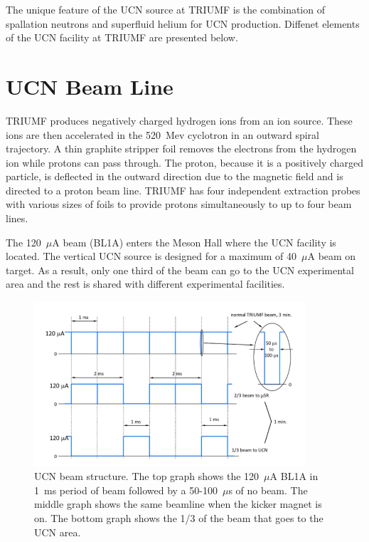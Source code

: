The unique feature of the UCN source at TRIUMF is the combination of
spallation neutrons and superfluid helium for UCN production. Diffenet
elements of the UCN facility at TRIUMF are presented below.

\section{UCN Beam Line}
TRIUMF produces negatively charged hydrogen ions from an ion
source. These ions are then accelerated in the 520~Mev cyclotron in an
outward spiral trajectory. A thin graphite stripper foil removes the
electrons from the hydrogen ion while protons can pass through. The
proton, because it is a positively charged particle, is deflected in
the outward direction due to the magnetic field and is directed to a
proton beam line. TRIUMF has four independent extraction probes with
various sizes of foils to provide protons simultaneously to up to four
beam lines.

The 120~$\mu$A beam (BL1A) enters the Meson Hall where the UCN
facility is located. The vertical UCN source is designed for a
maximum of 40~$\mu$A beam on target. As a result, only one third of
the beam can go to the UCN experimental area and the rest is shared
with different experimental facilities.

\begin{figure}[h!]
  \centering
  \includegraphics[width=0.9\textwidth]{bl1u.png}
  \caption{UCN beam structure. The top graph shows the 120~$\mu$A BL1A
    in 1~ms period of beam followed by a 50-100~$\mu$s of no
    beam. The middle graph shows the same beamline when the kicker
    magnet is on. The bottom graph shows the 1/3 of the beam that goes
    to the UCN area.}
  \label{fig:bl1u}
\end{figure}

